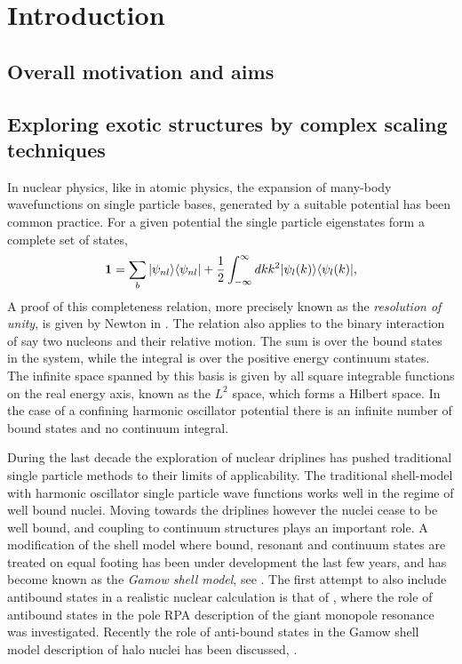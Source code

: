 \chapter{Introduction}
\section{Overall motivation and aims}

\section{Exploring exotic structures by complex scaling techniques}

In nuclear physics, like in atomic physics, the expansion of many-body wavefunctions on
single particle bases, generated by a suitable potential has been 
common practice. 
For a given potential the single particle eigenstates form a complete set of states, 
\begin{equation}
{\bf 1} = \sum _{b}\vert\psi_{nl}\rangle\langle\psi_{nl}\vert + 
{1\over 2}\int_{-\infty}^{\infty} dk k^2\vert\psi_{l}(k)\rangle\langle\psi_{l}(k)\vert,   
\label{eq:unity1}
\end{equation}
A proof of this completeness relation,
more precisely known as the \emph{resolution of unity}, 
is given by Newton in \cite{newton}. The relation also applies to the binary
interaction of say two nucleons and their relative motion.
 The sum is over the bound states in the
system, while the integral is over the positive energy continuum states. 
The infinite space spanned by this basis is given by all square integrable 
functions on the real energy axis, known as the $L^{2}$ space, which forms a Hilbert space.
In the case of a confining harmonic oscillator potential there is an infinite number
of bound states and no continuum integral.

During the last decade the exploration of nuclear driplines has pushed traditional 
single particle methods to their limits of applicability. 
The traditional shell-model with harmonic oscillator single particle wave functions
 works well in the regime 
of well bound nuclei. Moving towards the driplines however the nuclei cease to be well bound,  
and coupling to continuum structures plays an important role. A modification of the shell model 
where bound, resonant and continuum states are treated on equal footing
has been under development the last few years, and has 
become known as the \emph{Gamow shell model}, see 
\cite{liotta,betan,witek1,witek2,roberto}. The first attempt to also include antibound states 
in a realistic nuclear calculation is that of \cite{vertse}, where
the role of antibound states in the pole RPA description of the giant monopole resonance was
investigated. Recently the role of anti-bound states in the Gamow shell model 
description of halo nuclei has been discussed, \cite{betan2}.  
  
